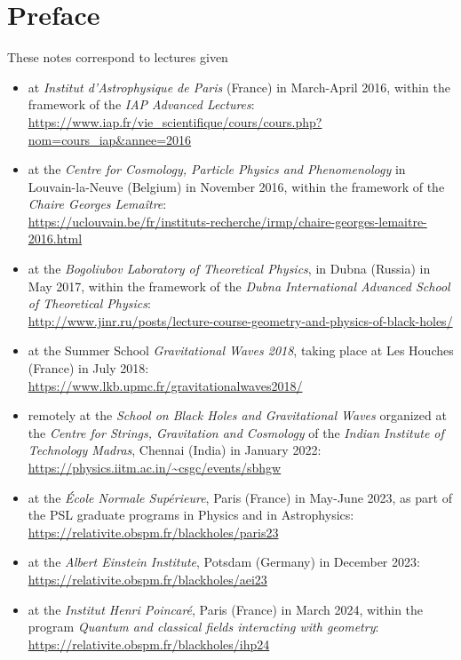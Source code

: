\chapter*{Preface}

These notes correspond to lectures given
\begin{itemize}
\item at \emph{Institut d'Astrophysique de Paris} (France) in March-April 2016, within the
framework of the \emph{IAP Advanced Lectures}:\\
{\footnotesize\url{https://www.iap.fr/vie_scientifique/cours/cours.php?nom=cours_iap&annee=2016}}
\item at the \emph{Centre for Cosmology, Particle Physics and Phenomenology} in Louvain-la-Neuve
(Belgium) in November 2016, within the framework of the \emph{Chaire Georges Lemaître}:\\
{\footnotesize \url{https://uclouvain.be/fr/instituts-recherche/irmp/chaire-georges-lemaitre-2016.html}}
\item at the
\emph{Bogoliubov Laboratory of Theoretical Physics}, in Dubna (Russia) in May 2017,
within the framework of the \emph{Dubna International Advanced School of Theoretical Physics}:\\
{\footnotesize\url{http://www.jinr.ru/posts/lecture-course-geometry-and-physics-of-black-holes/}}
\item at the Summer School \emph{Gravitational Waves 2018}, taking place at Les Houches
(France) in July 2018:\\
{\footnotesize\url{https://www.lkb.upmc.fr/gravitationalwaves2018/}}
\item remotely at the \emph{School on Black Holes and Gravitational Waves}
organized at the
\emph{Centre for Strings, Gravitation and Cosmology} of the
\emph{Indian Institute of Technology Madras}, Chennai (India) in January 2022:\\
{\footnotesize\url{https://physics.iitm.ac.in/~csgc/events/sbhgw}}
\item at the \emph{École Normale Supérieure}, Paris (France) in May-June 2023, as
part of the PSL graduate programs in Physics and in Astrophysics:\\
{\footnotesize\url{https://relativite.obspm.fr/blackholes/paris23}}
\item at the \emph{Albert Einstein Institute}, Potsdam (Germany) in December 2023:\\
{\footnotesize\url{https://relativite.obspm.fr/blackholes/aei23}}
\item at the \emph{Institut Henri Poincaré}, Paris (France) in March 2024, within the
program \emph{Quantum and classical fields interacting with geometry}:\\
{\footnotesize\url{https://relativite.obspm.fr/blackholes/ihp24}}
\end{itemize}

